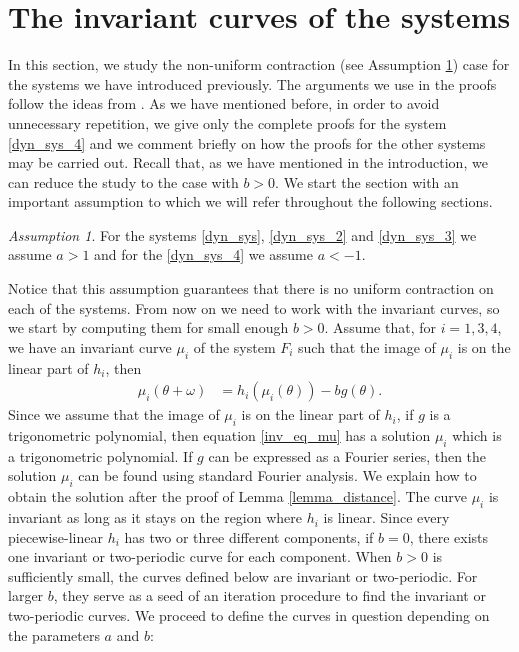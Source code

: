 \documentclass[12pt]{article}
\theoremstyle{plain}
\theoremstyle{remark}
\newtheorem{assumption}[defn]{Assumption}
\theoremstyle{definition}
\begin{document}
\section{The invariant curves of the systems}\label{invariant_curves_sect}
In this section, we study the non-uniform contraction (see Assumption \ref{assumptions_a}) case for the systems we have introduced previously. The arguments we use in the proofs follow the ideas from \cite{jorba2024nonsmooth}. As we have mentioned before, in order to avoid unnecessary repetition, we give only the complete proofs for the system \eqref{dyn_sys_4} and we comment briefly on how the proofs for the other systems may be carried out. Recall that, as we have mentioned in the introduction, we can reduce the study to the case with $b>0$. We start the section with an important assumption to which we will refer throughout the following sections.
\begin{assumption}\label{assumptions_a}
    For the systems \eqref{dyn_sys}, \eqref{dyn_sys_2} and \eqref{dyn_sys_3} we assume $a>1$ and for the \eqref{dyn_sys_4} we assume $a<-1$.
\end{assumption}
Notice that this assumption guarantees that there is no uniform contraction on each of the systems.
From now on we need to work with the invariant curves, so we start by computing them for small enough $b>0$. Assume that, for $i=1,3,4$, we have an invariant curve $\mu_i$ of the system $F_i$ such that the image of $\mu_i$ is on the linear part of $h_i$, then
\begin{align}\label{inv_eq_mu}
    \mu_i(\theta+\omega) &= h_{i}(\mu_i(\theta)) - b g(\theta).
\end{align}
Since we assume that the image of $\mu_i$ is on the linear part of $h_i$, if $g$ is a trigonometric polynomial, then equation \eqref{inv_eq_mu} has a solution $\mu_i$ which is a trigonometric polynomial. If $g$ can be expressed as a Fourier series, then the solution $\mu_i$ can be found using standard Fourier analysis. We explain how to obtain the solution after the proof of Lemma \ref{lemma_distance}. The curve $\mu_i$ is invariant as long as it stays on the region where $h_i$ is linear. Since every piecewise-linear $h_i$ has two or three different components, if $b=0$, there exists one invariant or two-periodic curve for each component. When $b>0$ is sufficiently small, the curves defined below are invariant or two-periodic. For larger $b$, they serve as a seed of an iteration procedure to find the invariant or two-periodic curves. We proceed to define the curves in question depending on the parameters $a$ and $b$: 
\end{document}
